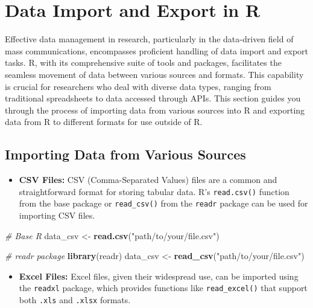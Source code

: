 \documentclass[
]{book}
\newenvironment{Shaded}{\begin{snugshade}}{\end{snugshade}}
\newcommand{\CommentTok}[1]{\textcolor[rgb]{0.56,0.35,0.01}{\textit{#1}}}
\newcommand{\FunctionTok}[1]{\textcolor[rgb]{0.13,0.29,0.53}{\textbf{#1}}}
\newcommand{\NormalTok}[1]{#1}
\newcommand{\OtherTok}[1]{\textcolor[rgb]{0.56,0.35,0.01}{#1}}
\newcommand{\StringTok}[1]{\textcolor[rgb]{0.31,0.60,0.02}{#1}}
\providecommand{\tightlist}{%
  \setlength{\itemsep}{0pt}\setlength{\parskip}{0pt}}
\begin{document}
\hypertarget{data-import-and-export-in-r}{%
\section{Data Import and Export in R}\label{data-import-and-export-in-r}}

Effective data management in research, particularly in the data-driven field of mass communications, encompasses proficient handling of data import and export tasks. R, with its comprehensive suite of tools and packages, facilitates the seamless movement of data between various sources and formats. This capability is crucial for researchers who deal with diverse data types, ranging from traditional spreadsheets to data accessed through APIs. This section guides you through the process of importing data from various sources into R and exporting data from R to different formats for use outside of R.

\hypertarget{importing-data-from-various-sources}{%
\subsection*{Importing Data from Various Sources}\label{importing-data-from-various-sources}}

\begin{itemize}
\tightlist
\item
  \textbf{CSV Files:} CSV (Comma-Separated Values) files are a common and straightforward format for storing tabular data. R's \texttt{read.csv()} function from the base package or \texttt{read\_csv()} from the \texttt{readr} package can be used for importing CSV files.
\end{itemize}

\begin{Shaded}
\begin{Highlighting}[]
\CommentTok{\# Base R}
\NormalTok{data\_csv }\OtherTok{\textless{}{-}} \FunctionTok{read.csv}\NormalTok{(}\StringTok{"path/to/your/file.csv"}\NormalTok{)}

\CommentTok{\# readr package}
\FunctionTok{library}\NormalTok{(readr)}
\NormalTok{data\_csv }\OtherTok{\textless{}{-}} \FunctionTok{read\_csv}\NormalTok{(}\StringTok{"path/to/your/file.csv"}\NormalTok{)}
\end{Highlighting}
\end{Shaded}

\begin{itemize}
\tightlist
\item
  \textbf{Excel Files:} Excel files, given their widespread use, can be imported using the \texttt{readxl} package, which provides functions like \texttt{read\_excel()} that support both \texttt{.xls} and \texttt{.xlsx} formats.
\end{itemize}
\end{document}

